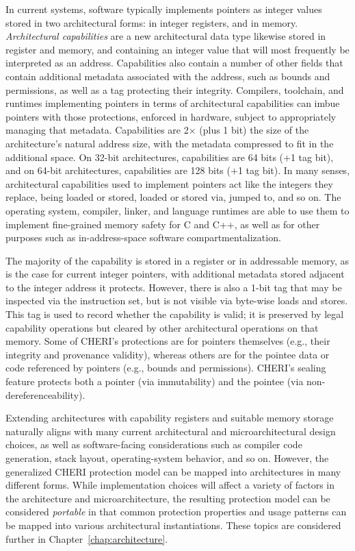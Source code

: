 In current systems, software typically implements pointers as integer values
stored in two architectural forms: in integer registers, and in memory.
\textit{Architectural capabilities} are a new architectural data type likewise
stored in register and memory, and containing an integer value that will most
frequently be interpreted as an address.
Capabilities also contain a number of other fields that contain additional
metadata associated with the address, such as bounds and permissions, as well
as a tag protecting their integrity.
Compilers, toolchain, and runtimes implementing pointers in terms of
architectural capabilities can imbue pointers with those protections, enforced
in hardware, subject to appropriately managing that metadata.
Capabilities are 2$\times$ (plus 1 bit) the size of the architecture's
natural address size, with the metadata compressed to fit in the additional
space.
On 32-bit architectures, capabilities are 64 bits ($+$1 tag bit), and on
64-bit architectures, capabilities are 128 bits ($+$1 tag bit).
In many senses, architectural capabilities used to implement pointers act like
the integers they replace, being loaded or stored, loaded or stored via,
jumped to, and so on.
The operating system, compiler, linker, and language runtimes are able to use
them to implement fine-grained memory safety for C and C++, as well as for
other purposes such as in-address-space software compartmentalization.

The majority of the capability is stored in a register or in
addressable memory, as is the case
for current integer pointers, with additional metadata stored adjacent to the
integer address it protects.
However, there is also a 1-bit tag that may be
inspected via the instruction set, but is not visible via byte-wise loads and
stores.
This tag is used to record whether the capability is valid; it is
preserved by legal capability operations but cleared by other architectural
operations on that memory.
%
Some of CHERI's protections are for pointers themselves (e.g., their integrity
and provenance validity), whereas others are for the pointee data or code
referenced by pointers (e.g., bounds and permissions).
CHERI's sealing feature protects both a pointer (via immutability) and the
pointee (via non-dereferenceability).

Extending architectures with capability registers and suitable memory storage
naturally aligns with many current architectural and microarchitectural design
choices, as well as software-facing considerations such as compiler code
generation, stack layout, operating-system behavior, and so on.
However, the generalized CHERI protection model can be mapped into
architectures in many different forms.
While implementation choices will affect a variety of factors in the
architecture and microarchitecture, the resulting protection model can be
considered \textit{portable} in that common protection properties and usage
patterns can be mapped into various architectural instantiations.
These topics are considered further in Chapter~\ref{chap:architecture}.


